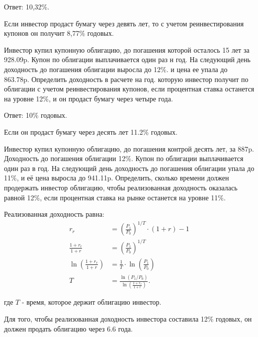 \documentclass[12pt, table, a4paper,twoside]{exam}
\begin{document}
\begin{questions}
\begin{solution}[12em]
	
	\raggedright
	Ответ: 10,32\%.
	
	Если инвестор продаст бумагу через девять лет, то с учетом реинвестирования купонов он получит 8,77\% годовых.
	
\end{solution}

\question[10] Инвестор купил купонную облигацию, до погашения которой осталось 15 лет за 928.09p. Купон по облигации выплачивается один раз н год. На следующий день доходность до погашения облигации выросла до 12\%. и цена ее упала до 863.78p. Определить доходность в расчете на год. которую инвестор получит по облигации с учетом реинвестирования купонов, если процентная ставка останется на уровне 12\%, и он продаст бумагу через четыре года.

\begin{solution}[12em]
	
	\raggedright
	Ответ: 10\% годовых.
	
	Если он продаст бумагу через десять лет 11.2\% годовых.
	
\end{solution}

\question[10] Инвестор купил купонную облигацию, до погашения контрой десять лет, за 887p. Доходность до погашения облигации 12\%. Купон по облигации выплачивается один раз в год. На следующий день доходность до погашения облигации упала до 11\%, и её цена выросла до 941.11p. Определить, сколько времени должен продержать инвестор облигацию, чтобы реализованная доходность оказалась равной 12\%, если процентная ставка на рынке останется на уровне 11\%.

\begin{solution}[12em]

	\raggedright
	Реализованная доходность равна:
	\begin{align}
	r_r&=\left(\frac{P_1}{P_0}\right)^{1/T} \cdot (1+r) - 1\nonumber\\
	\frac{1+r_r}{1+r} &= \left( \frac{P_1}{P_0} \right)^{1/T}\nonumber\\
	\ln(\frac{1+r_r}{1+r}) &= \frac{1}{T} \cdot \ln(\frac{P_1}{P_0})\nonumber\\
	T&=\frac{\ln(P_1/P_0)}{\ln(\frac{1+r_r}{1+r})}.
	\end{align}

	где $T$ - время, которое держит облигацию инвестор.

	Для того, чтобы реализованная доходность инвестора составила 12\% годовых, он должен продать облигацию через 6.6 года.
\end{solution}





\end{questions}
\end{document}

